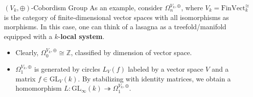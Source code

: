 \documentclass[12pt]{beamer}
\begin{document}
\begin{frame}{$(V_k,\oplus)$-Cobordism Group}
  As an example, consider $\Omega^{V_k,\oplus}_n$, where $V_k=\mathrm{FinVect}^{\cong}_k$ is the category of finite-dimensional vector spaces with all isomorphisms as morphisms. In this case, one can think of a lasagna as a treefold/manifold equipped with a $k$-\textbf{local system}.
  \pause
\begin{itemize}
  \item Clearly, $\Omega^{V_k,\oplus}_0\cong \mathbb{Z}$, classified by dimension of vector space.
  \pause

\item $\Omega^{V_k,\oplus}_1$ is generated by circles $L_V(f)$ labeled by a vector space $V$ and a matrix $f\in \mathrm{GL}_V(k)$. By stabilizing with identity matrices, we obtain a homomorphism $L:\mathrm{GL}_{\infty}(k) \twoheadrightarrow \Omega^{V_k,\oplus}_1$.

\end{itemize}
  \begin{center}
    



\begin{tikzpicture}[x=0.75pt,y=0.75pt,yscale=-1,xscale=1]


\end{tikzpicture}
\end{center}
\end{frame}
\end{document}
